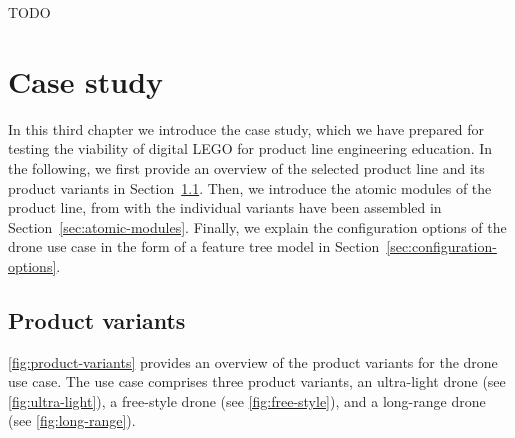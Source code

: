 \documentclass[sigconf,review]{acmart}
\begin{document}
TODO

\section{Case study}
\label{sec:case-study}

In this third chapter we introduce the case study, which we have prepared for testing the viability of digital LEGO for product line engineering education.
In the following, we first provide an overview of the selected product line and its product variants in Section~\ref{sec:product-variants}.
Then, we introduce the atomic modules of the product line, from with the individual variants have been assembled in Section~\ref{sec:atomic-modules}.
Finally, we explain the configuration options of the drone use case in the form of a feature tree model in Section~\ref{sec:configuration-options}.

\subsection{Product variants}
\label{sec:product-variants}

\cref{fig:product-variants} provides an overview of the product variants for the drone use case.
The use case comprises three product variants, an ultra-light drone (see \cref{fig:ultra-light}), a free-style drone (see \cref{fig:free-style}), and a long-range drone (see \cref{fig:long-range}).
\end{document}
